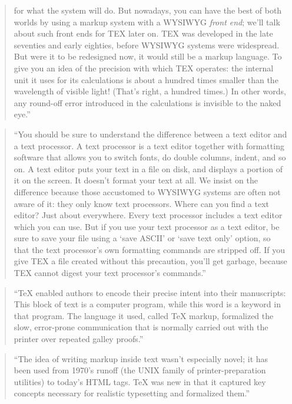 \documentclass[]{tufte-book}
\begin{document}
\begin{quote}
for what the system will do. But nowadays, you can have the best of both worlds
by using a markup system with a WYSIWYG \emph{front end}; we'll talk about such front
ends for TEX later on. TEX was developed in the late seventies and early eighties,
before WYSIWYG systems were widespread. But were it to be redesigned now, it would
still be a markup
language. To give you an idea of the precision with which TEX operates: the internal
unit it uses for its calculations is about a hundred times smaller than the
wavelength of visible light! (That's right, a hundred times.) In other words, any
round-off error introduced in the calculations is invisible to the naked eye.''
\citep{seroul2012beginner}
\end{quote}

\begin{quote}
``You should be sure to understand the difference between a text editor and a text
processor. A text processor is a text editor together with formatting software that
allows you to switch fonts, do double columns, indent, and so on. A text editor
puts your text in a file on disk, and displays a portion of it on the screen. It doesn't
format your text at all. We insist on the difference because those accustomed to WYSIWYG systems are
often not aware of it: they only know text processors. Where can you find a text
editor? Just about everywhere. Every text processor includes a text editor which
you can use. But if you use your text processor as a text editor, be sure to save your
file using a `save ASCII' or `save text only' option, so that the text processor's own
formatting commands are stripped off. If you give TEX a file created without this
precaution, you'll get garbage, because TEX cannot digest your text processor's
commands.'' \citep{seroul2012beginner}
\end{quote}

\begin{quote}
``TeX enabled authors to encode their precise intent into their manuscripts:
This block of text is a computer program, while this word is a keyword in that
program. The language it used, called TeX markup, formalized the slow,
error-prone communication that is normally carried out with the printer over
repeated galley proofs.'' \citep{apte2019lingua}
\end{quote}

\begin{quote}
``The idea of writing markup inside text wasn't especially novel; it has been
used from 1970's runoff (the UNIX family of printer-preparation utilities) to
today's HTML tags. TeX was new in that it captured key concepts necessary for
realistic typesetting and formalized them.'' \citep{apte2019lingua}
\end{quote}
\end{document}
